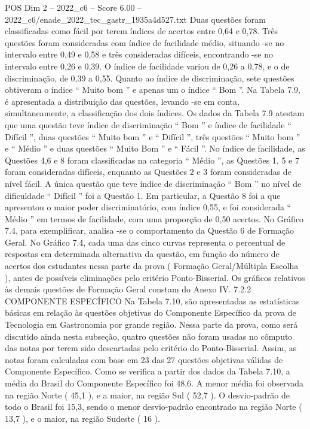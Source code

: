 \begin{textsample}{POS Dim 2 – 2022\_c6 – Score 6.00 – 2022\_c6/enade\_2022\_tec\_gastr\_1935a4d527.txt}
Duas questões foram classificadas como fácil por terem índices de acertos entre 0,64 e 0,78.
Três questões foram consideradas com índice de facilidade médio, situando -se no intervalo entre 0,49 e 0,58 e três consideradas difíceis, encontrando -se no intervalo entre 0,26 e 0,39.
O índice de facilidade variou de 0,26 a 0,78, e o de discriminação, de 0,39 a 0,55.
Quanto ao índice de discriminação, sete questões obtiveram o índice “ Muito bom ” e apenas um o índice “ Bom ”.
Na Tabela 7.9, é apresentada a distribuição das questões, levando -se em conta, simultaneamente, a classificação dos dois índices.
Os dados da Tabela 7.9 atestam que uma questão teve índice de discriminação “ Bom ” e índice de facilidade “ Difícil ”, duas questões “ Muito bom ” e “ Difícil ”, três questões “ Muito bom ” e “ Médio ” e duas questões “ Muito Bom ” e “ Fácil ”.
No índice de facilidade, as Questões 4,6 e 8 foram classificadas na categoria “ Médio ”, as Questões 1, 5 e 7 foram consideradas difíceis, enquanto as Questões 2 e 3 foram consideradas de nível fácil.
A única questão que teve índice de discriminação “ Bom ” no nível de dificuldade “ Difícil ” foi a Questão 1.
Em particular, a Questão 8 foi a que apresentou o maior poder discriminatório, com índice 0,55, e foi considerada “ Médio ” em termos de facilidade, com uma proporção de 0,50 acertos.
No Gráfico 7.4, para exemplificar, analisa -se o comportamento da Questão 6 de Formação Geral.
No Gráfico 7.4, cada uma das cinco curvas representa o percentual de respostas em determinada alternativa da questão, em função do número de acertos dos estudantes nessa parte da prova ( Formação Geral/Múltipla Escolha ), antes de possíveis eliminações pelo critério Ponto-Bisserial.
Os gráficos relativos às demais questões de Formação Geral constam do Anexo IV. 7.2.2 COMPONENTE ESPECÍFICO Na Tabela 7.10, são apresentadas as estatísticas básicas em relação às questões objetivas do Componente Específico da prova de Tecnologia em Gastronomia por grande região.
Nessa parte da prova, como será discutido ainda nesta subseção, quatro questões não foram usadas no cômputo das notas por terem sido descartadas pelo critério do Ponto-Bisserial.
Assim, as notas foram calculadas com base em 23 das 27 questões objetivas válidas de Componente Específico.
Como se verifica a partir dos dados da Tabela 7.10, a média do Brasil do Componente Específico foi 48,6.
A menor média foi observada na região Norte ( 45,1 ), e a maior, na região Sul ( 52,7 ).
O desvio-padrão de todo o Brasil foi 15,3, sendo o menor desvio-padrão encontrado na região Norte ( 13,7 ), e o maior, na região Sudeste ( 16 ).

\end{textsample}
